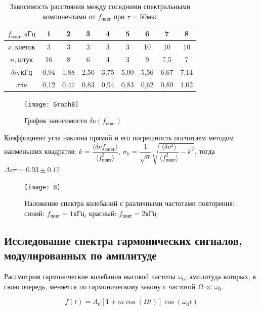 \documentclass[a4paper, 12pt]{article}
\begin{document}
\begin{table}[H]
\centering
\begin{tabular}{|c|c|c|c|c|c|c|c|c|}
\hline
$f_\text{повт}, \text{кГц}$ & 1    & 2    & 3    & 4    & 5    & 6    & 7    & 8    \\ \hline
$x, \text{клеток}$          & 3    & 3    & 3    & 3    & 3    & 10   & 10   & 10   \\ \hline
$n, \text{штук}$                        & 16   & 8    & 6    & 4    & 3    & 9    & 7,5  & 7    \\ \hline
$\delta \nu, \text{кГц}$    & 0,94 & 1,88 & 2,50 & 3,75 & 5,00 & 5,56 & 6,67 & 7,14 \\ \hline
$\sigma \delta \nu$      & 0,12 & 0,47 & 0,83 & 0,94 & 0,83 & 0,62 & 0,89 & 1,02 \\ \hline
\end{tabular}
\caption{Зависимость расстояния между соседними спектральными компонентами от $f_\text{повт}$ при $\tau = 50 \text{мкс}$ }
\end{table}

\begin{figure}[H]
\centering
\texttt{[image: GraphB]}
\caption{График зависимости $\delta \nu (f_\text{повт})$}
\end{figure}

Коэффициент угла наклона прямой и его погрешность посчитаем методом наименьших квадратов: $k = \dfrac{\langle \delta \nu f_\text{повт}  \rangle}{\langle f_\text{повт}^2 \rangle}$, $\sigma_k = \dfrac{1}{\sqrt{n}} \sqrt{\dfrac{\langle \delta \nu^2 \rangle}{\langle f_\text{повт}^2 \rangle} - k^2}$, тогда $\Delta \nu \tau = 0.93 \pm 0.17$

\begin{figure}[H]
\centering
\texttt{[image: B]}
\caption{Наложение спектра колебаний с различными частотами повторения: синий: $f_\text{повт} = 1 \text{кГц}$, красный: $f_\text{повт} = 2 \text{кГц}$}
\end{figure}

\subsection*{Исследование спектра гармонических сигналов, модулированных по амплитуде}

Рассмотрим гармонические колебания высокой частоты $\omega_0$, амплитуда которых, в свою очередь, меняется по гармоническому закону с частотой $\Omega \ll \omega_0$.

\begin{equation}
\label{form:amf(t)_a_n}
	f(t) = A_0[1+m\cos(\Omega t)]\cos(\omega_0t)
\end{equation}
\end{document}
